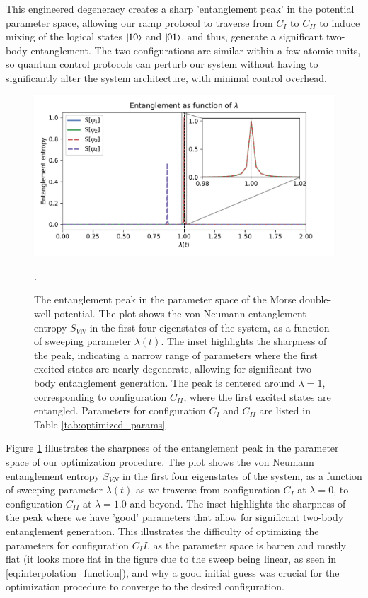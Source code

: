 \documentclass{subfiles}
\begin{document}
This engineered degeneracy creates a sharp 'entanglement peak' in the potential parameter space, allowing our ramp protocol to traverse from $C_I$ to $C_{II}$ to induce mixing of the logical states $\ket{10}$ and $\ket{01}$, and thus, generate a significant two-body entanglement. The two configurations are similar within a few atomic units, so quantum control protocols can perturb our system without having to significantly alter the system architecture, with minimal control overhead.
\begin{figure}[h!]
  \centering
  \includegraphics[width=1.0\textwidth]{figs/entanglement_peak.pdf}
  \caption{The entanglement peak in the parameter space of the Morse double-well potential. The plot shows the von Neumann entanglement entropy $S_{VN}$ in the first four eigenstates of the system, as a function of sweeping parameter $\lambda(t)$. The inset highlights the sharpness of the peak, indicating a narrow range of parameters where the first excited states are nearly degenerate, allowing for significant two-body entanglement generation. The peak is centered around $\lambda = 1$, corresponding to configuration $C_{II}$, where the first excited states are entangled. Parameters for configuration $C_I$ and $C_{II}$ are listed in Table \ref{tab:optimized_params}}. 
  \label{fig:entanglement_peak}
\end{figure}
Figure \ref{fig:entanglement_peak} illustrates the sharpness of the entanglement peak in the parameter space of our optimization procedure. The plot shows the von Neumann entanglement entropy $S_{VN}$ in the first four eigenstates of the system, as a function of sweeping parameter $\lambda(t)$ as we traverse from configuration $C_I$ at $\lambda = 0$, to configuration $C_{II}$ at $\lambda = 1.0$ and beyond. The inset highlights the sharpness of the peak where we have 'good' parameters that allow for significant two-body entanglement generation. This illustrates the difficulty of optimizing the parameters for configuration $C_II$, as the parameter space is barren and mostly flat (it looks more flat in the figure due to the sweep being linear, as seen in \eqref{eq:interpolation_function}), and why a good initial guess was crucial for the optimization procedure to converge to the desired configuration.
\end{document}
